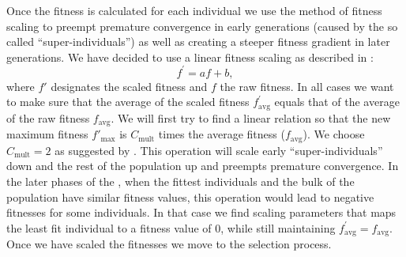 Once the fitness is calculated for each individual we use the method of fitness scaling to preempt premature convergence in early generations (caused by the so called ``super-individuals'') as well as creating a steeper fitness gradient in later generations. We have decided to use a linear fitness scaling as described in \citet{citeulike:125978}:
\[
f^\prime = af+b,
\]
where $f\prime$ designates the scaled fitness and $f$ the raw fitness.
In all cases we want to make sure that the average of the scaled fitness $f_\textrm{avg}^\prime$ equals that of the average of the raw fitness $f_\textrm{avg}$. We will first try to find a linear relation so that the new maximum fitness $f'_\textrm{max}$ is $C_\textrm{mult}$ times the average fitness ($f_\textrm{avg}$). We choose $C_\textrm{mult}=2$ as suggested by \citet{citeulike:125978}. This operation will scale early ``super-individuals'' down and the rest of the population up and preempts premature convergence. In the later phases of the \ga, when the fittest individuals and the bulk of the population have similar fitness values, this operation would lead to negative fitnesses for some individuals. In that case we find scaling parameters that maps the least fit individual to a fitness value of 0, while still maintaining $f_\textrm{avg}^\prime=f_\textrm{avg}$. Once we have scaled the fitnesses we move to the selection process.

